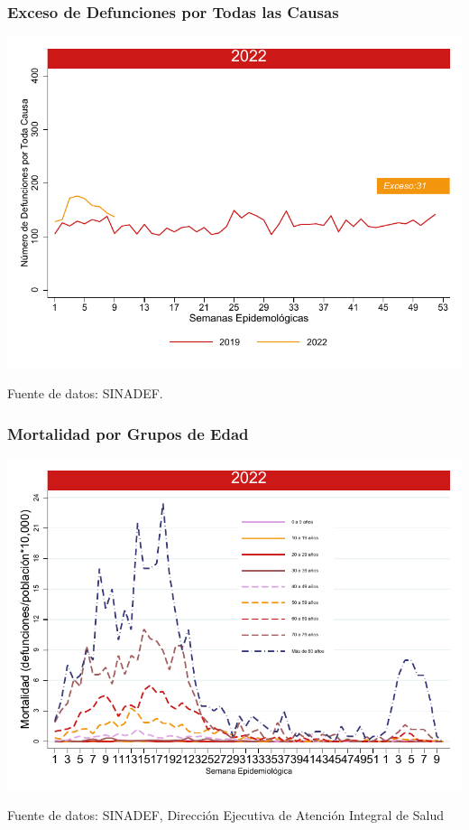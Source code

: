 \documentclass[xcolor=table]{beamer}
\begin{document}
	\begin{frame}
		\frametitle{Exceso de Defunciones por Todas las Causas}
		\vspace{-.5cm}
		\begin{center}
			\includegraphics[width=0.9\linewidth]{../figuras/exceso_region_2022.pdf}
		\end{center}
		{\tiny Fuente de datos: SINADEF.} 
	\end{frame}
	
	\begin{frame}
		\frametitle{Mortalidad por Grupos de Edad}
		\vspace{-.5cm}
		\begin{center}
			\includegraphics[width=0.9\linewidth]{../figuras/mortalidad_edad_2021_2022.pdf}
		\end{center}
		{\tiny Fuente de datos: SINADEF, Dirección Ejecutiva de Atención Integral de Salud} 
	\end{frame}
\end{document}
